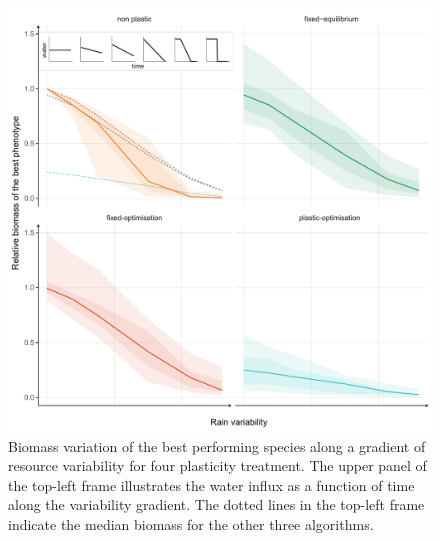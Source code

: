 \begin{figure}\label{fig:variable_BM}
\includegraphics[width = \textwidth]{./2_PP/Figures/Variable/var_relnone_BM_trend.pdf}
\caption[Biomass variations along a gradient of resource variability]{Biomass variation of the best performing species along a gradient of resource variability for four plasticity treatment. The upper panel of the top-left frame illustrates the water influx as a function of time along the variability gradient. The dotted lines in the top-left frame indicate the median biomass for the other three algorithms. }
\end{figure}

%

